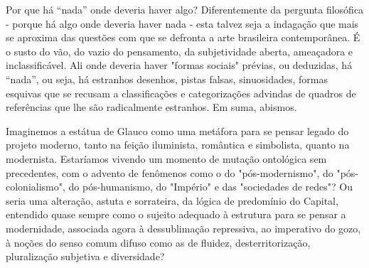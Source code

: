 \begin{multicols}{2}
\noindent{}Por que há ``nada'' onde deveria haver algo? Diferentemente da pergunta
filosófica - porque há algo onde deveria haver nada - esta talvez seja a
indagação que mais se aproxima das questões com que se defronta a arte
brasileira contemporânea. É o susto do vão, do vazio do pensamento, da
subjetividade aberta, ameaçadora e inclassificável. Ali onde deveria
haver "formas sociais" prévias, ou deduzidas, há ``nada'', ou seja, há
estranhos desenhos, pistas falsas, sinuosidades, formas esquivas que se
recusam a classificações e categorizações advindas de quadros de
referências que lhe são radicalmente estranhos. Em suma, abismos.


\vspace{\baselineskip}

{\small{}}

\vspace{\baselineskip}

Imaginemos a estátua de Glauco como uma metáfora para se pensar legado
do projeto moderno, tanto na feição iluminista, romântica e simbolista,
quanto na modernista. Estaríamos vivendo um momento de mutação
ontológica sem precedentes, com o advento de fenômenos como o do
"pós-modernismo", do "pós-colonialismo", do pós-humanismo, do "Império"
e das "sociedades de redes"? Ou seria uma alteração, astuta e
sorrateira, da lógica de predomínio do Capital, entendido quase sempre
como o sujeito adequado à estrutura para se pensar a modernidade,
associada agora à dessublimação repressiva, ao imperativo do gozo, à
noções do senso comum difuso como as de fluidez, desterritorização,
pluralização subjetiva e diversidade?


\end{multicols}
